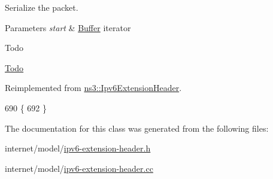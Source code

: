 Serialize the packet. 


\begin{DoxyParams}{Parameters}
{\em start} & \hyperlink{classns3_1_1Buffer}{Buffer} iterator \\
\hline
\end{DoxyParams}
\begin{DoxyRefDesc}{Todo}
\item[\hyperlink{todo__todo000050}{Todo}]\end{DoxyRefDesc}


Reimplemented from \hyperlink{classns3_1_1Ipv6ExtensionHeader_a98bce1a4ea1265b45c480eed63dc2893}{ns3\+::\+Ipv6\+Extension\+Header}.


\begin{DoxyCode}
690 \{
692 \}
\end{DoxyCode}


The documentation for this class was generated from the following files\+:\begin{DoxyCompactItemize}
\item 
internet/model/\hyperlink{ipv6-extension-header_8h}{ipv6-\/extension-\/header.\+h}\item 
internet/model/\hyperlink{ipv6-extension-header_8cc}{ipv6-\/extension-\/header.\+cc}\end{DoxyCompactItemize}
